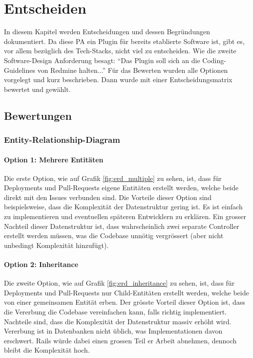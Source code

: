 \chapter{Entscheiden}
\label{chap:decide}
In diesem Kapitel werden Entscheidungen und dessen Begründungen dokumentiert. \newline
Da diese PA ein Plugin für bereits etablierte Software ist, gibt es, vor allem bezüglich des Tech-Stacks, nicht viel zu
entscheiden. Wie die zweite Software-Design Anforderung besagt: \enquote{Das Plugin soll sich an die Coding-Guidelines von
Redmine halten...} \newline
Für das Bewerten wurden alle Optionen vorgelegt und kurz beschrieben. Dann wurde mit einer Entscheidungsmatrix
bewertet und gewählt.

\section{Bewertungen}
\subsection{Entity-Relationship-Diagram}
\subsubsection{Option 1: Mehrere Entitäten}
Die erste Option, wie auf Grafik \ref{fig:erd_multiple} zu sehen, ist, dass für Deployments und Pull-Requests
eigene Entitäten erstellt werden, welche beide direkt mit den Issues verbunden sind. \newline
Die Vorteile dieser Option sind beispielsweise, dass die Komplexität der Datenstruktur gering ist. Es ist einfach zu
implementieren und eventuellen späteren Entwicklern zu erklären. \newline
Ein grosser Nachteil dieser Datenstruktur ist, dass wahrscheinlich zwei separate Controller erstellt werden müssen, was
die Codebase unnötig vergrössert (aber nicht unbedingt Komplexität hinzufügt).

\subsubsection{Option 2: Inheritance}
Die zweite Option, wie auf Grafik \ref{fig:erd_inheritance} zu sehen, ist, dass für Deployments und Pull-Requests nur
Child-Entitäten erstellt werden, welche beide von einer gemeinsamen Entität erben. \newline
Der grösste Vorteil dieser Option ist, dass die Vererbung die Codebase vereinfachen kann, falls richtig implementiert.
\newline
Nachteile sind, dass die Komplexität der Datenstruktur massiv erhöht wird. Vererbung ist in Datenbanken nicht üblich, was
Implementationen davon erschwert. Rails würde dabei einen grossen Teil er Arbeit abnehmen, dennoch bleibt die Komplexität
hoch.

